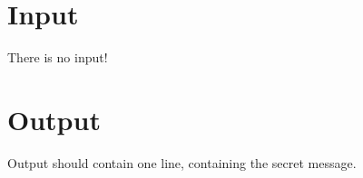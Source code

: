 
\section*{Input}

There is no input!

\section*{Output}

Output should contain one line, containing the secret message. 

